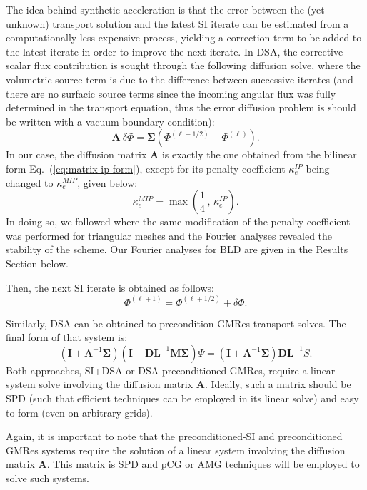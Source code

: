 \documentclass{mc2013}
\newcommand\bs{\boldsymbol}
\renewcommand{\(}{\left(}
\renewcommand{\)}{\right)}
\renewcommand{\[}{\left[}
\renewcommand{\]}{\right]}
\newcommand{\eqt}[1]{Eq.~(\ref{#1})}                     %
\begin{document}
The idea behind synthetic acceleration is that the error between the (yet
unknown) transport solution and the latest SI iterate can be estimated from a
computationally less expensive process, yielding a correction term to be added
to the latest iterate in order to improve the next iterate. In DSA, the
corrective scalar flux contribution is sought through the following
diffusion solve, where the volumetric source term is due to the difference between
successive iterates (and there are no surfacic source terms since the incoming angular flux was
fully determined in the transport equation, thus the error diffusion problem is should 
be written with a vacuum boundary condition):
\begin{equation}
  \bs{A}\ \delta \Phi = \bs{\Sigma}\(\Phi^{(\ell+1/2)} - \Phi^{(\ell)}\).
\end{equation}
In our case, the diffusion matrix $\bs{A}$ is exactly the one obtained from the bilinear form \eqt{eq:matrix-ip-form},
except for its penalty coefficient $\kappa_e^{IP}$ being changed to $\kappa_e^{MIP}$, given below: 
\begin{equation}
\kappa_e^{MIP} = \max \( \frac{1}{4}\, , \, \kappa_e^{IP} \) .
\end{equation}
In doing so, we followed \cite{mip} where the same modification of the penalty coefficient was performed 
for triangular meshes and the Fourier analyses revealed the stability of the scheme. 
Our Fourier analyses for BLD are given in the Results Section below.

Then, the next SI iterate is obtained as follows:
\begin{equation}
  \Phi^{(\ell+1)} = \Phi^{(\ell+1/2)}+\delta \Phi.
\end{equation}

Similarly, DSA can be obtained to precondition GMRes transport solves. The
final form of that system is:
\begin{equation}
  \(\bs{I} +\bs{A}^{-1} \bs{\Sigma}\)\(\bs{I}-\bs{DL}^{-1}\bs{M\Sigma}\) \Psi
  = \(\bs{I}+\bs{A}^{-1}\bs{\Sigma}\) \bs{DL}^{-1} S.
\end{equation}
Both approaches, SI+DSA or DSA-preconditioned GMRes, require a linear system
solve involving the diffusion matrix $\bs{A}$. Ideally, such a matrix should
be SPD (such that efficient techniques can be employed in its linear solve)
and easy to form (even on arbitrary grids).

Again, it is important to note that the preconditioned-SI and preconditioned GMRes systems 
require the solution of a linear system involving the diffusion matrix $\bs{A}$. This matrix is 
SPD and pCG or AMG techniques will be employed to solve such systems.
\end{document}
